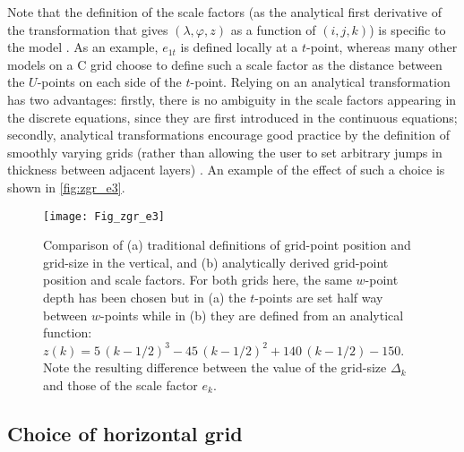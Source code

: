 \documentclass[../main/NEMO_manual]{subfiles}
\begin{document}
Note that the definition of the scale factors
(\ie as the analytical first derivative of the transformation that
gives $(\lambda,\varphi,z)$ as a function of $(i,j,k)$)
is specific to the \NEMO model \citep{Marti_al_JGR92}.
As an example, $e_{1t}$ is defined locally at a $t$-point,
whereas many other models on a C grid choose to define such a scale factor as
the distance between the $U$-points on each side of the $t$-point.
Relying on an analytical transformation has two advantages:
firstly, there is no ambiguity in the scale factors appearing in the discrete equations,
since they are first introduced in the continuous equations;
secondly, analytical transformations encourage good practice by the definition of smoothly varying grids
(rather than allowing the user to set arbitrary jumps in thickness between adjacent layers) \citep{Treguier1996}.
An example of the effect of such a choice is shown in \autoref{fig:zgr_e3}.
\begin{figure}[!t]
  \begin{center}
    \texttt{[image: Fig\_zgr\_e3]}
    \caption{
      \protect\label{fig:zgr_e3}
      Comparison of (a) traditional definitions of grid-point position and grid-size in the vertical,
      and (b) analytically derived grid-point position and scale factors.
      For both grids here, the same $w$-point depth has been chosen but
      in (a) the $t$-points are set half way between $w$-points while
      in (b) they are defined from an analytical function:
      $z(k) = 5 \, (k - 1/2)^3 - 45 \, (k - 1/2)^2 + 140 \, (k - 1/2) - 150$.
      Note the resulting difference between the value of the grid-size $\Delta_k$ and
      those of the scale factor $e_k$.
    }
  \end{center}
\end{figure}

\subsection{Choice of horizontal grid}
\label{subsec:DOM_hgr_msh_choice}

\end{document}
